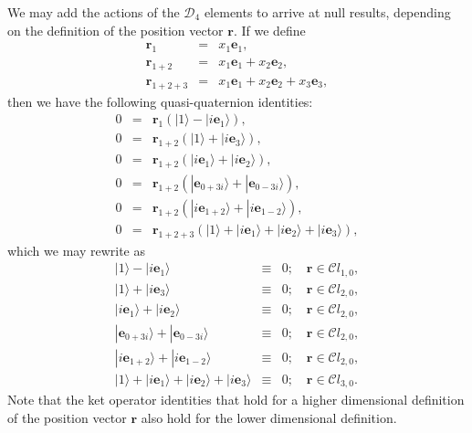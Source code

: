 \documentclass[11pt,twocolumn]{article}
\begin{document}
We may add the actions of the $\mathcal D_4$ elements to arrive at null results, depending on the definition of the position vector $\mathbf r$.  If we define
\begin{eqnarray}
\label{eq:r_1 is x_1e_1}
\mathbf r_1&=&x_1\mathbf e_1,\\
\label{eq:r_1+2 is x_1e_1 + x_2e_1}
\mathbf r_{1+2}&=&x_1\mathbf e_1+x_2\mathbf e_2,\\
\label{eq:r_1+2+3 is x_1e_1 + x_2e_2 + x_3e_3}
\mathbf r_{1+2+3}&=&x_1\mathbf e_1+x_2\mathbf e_2+x_3\mathbf e_3,
\end{eqnarray}
then we have the following quasi-quaternion identities:
\begin{eqnarray}
\label{eq:r_1 by 1 - ie_1 is 0}
0&=&\mathbf r_1(|1\rangle-|i\mathbf e_1\rangle),\\
\label{eq:r_1+2 by 1 + ie_3 is 0}
0&=&\mathbf r_{1+2}(|1\rangle+|i\mathbf e_3\rangle),\\
\label{eq:r_1+2 by ie_1 + ie_2 is 0}
0&=&\mathbf r_{1+2}(|i\mathbf e_1\rangle+|i\mathbf e_2\rangle),\\
\label{eq:r_1+2 by e_0+3i + e_0-3i is 0}
0&=&\mathbf r_{1+2}(|\mathbf e_{0+3i}\rangle+|\mathbf e_{0-3i}\rangle),\\
\label{eq:r_1+2 by ie_1+2 + ie_1-2 is 0}
0&=&\mathbf r_{1+2}(|i\mathbf e_{1+2}\rangle+|i\mathbf e_{1-2}\rangle),\\
\label{eq:r_1+2+3 by 1 + ie_1 + ie_2 + ie_3 is 0}
0&=&\mathbf r_{1+2+3}(|1\rangle+|i\mathbf e_1\rangle+|i\mathbf e_2\rangle+|i\mathbf e_3\rangle),
\end{eqnarray}
which we may rewrite as
\begin{eqnarray}
\label{eq:1 - ie_1 equiv 0 if r in Cl_1,0}
|1\rangle-|i\mathbf e_1\rangle&\equiv& 0;\quad \mathbf r\in \mathcal Cl_{1,0},\\ 
\label{eq:1 + ie_3 equiv 0 if r in Cl_2,0}
|1\rangle+|i\mathbf e_3\rangle&\equiv&0;\quad\mathbf r\in\mathcal Cl_{2,0},\\
\label{eq:ie_1 + ie_2 equiv 0 if r in Cl_2,0}
|i\mathbf e_1\rangle+|i\mathbf e_2\rangle&\equiv&0;\quad\mathbf r\in\mathcal Cl_{2,0},\\
\label{eq:e_0+3i + e_0-3i equiv 0 if r in Cl_2,0}
|\mathbf e_{0+3i}\rangle+|\mathbf e_{0-3i}\rangle&\equiv&0;\quad\mathbf r\in\mathcal Cl_{2,0},\\
\label{eq:ie_1+2 + ie_1-2 equiv 0 if r in Cl_2,0}
|i\mathbf e_{1+2}\rangle+|i\mathbf e_{1-2}\rangle&\equiv&0;\quad\mathbf r\in\mathcal Cl_{2,0},\\
\label{eq:1 + ie_1 + ie_2 + ie_3 equiv 0 if r in Cl_3,0}
|1\rangle+|i\mathbf e_1\rangle+|i\mathbf e_2\rangle+|i\mathbf e_3\rangle&\equiv&0;\quad\mathbf r\in\mathcal Cl_{3,0}.
\end{eqnarray}
Note that the ket operator identities that hold for a higher dimensional definition of the position vector $\mathbf r$ also hold for the lower dimensional definition.
\end{document}
